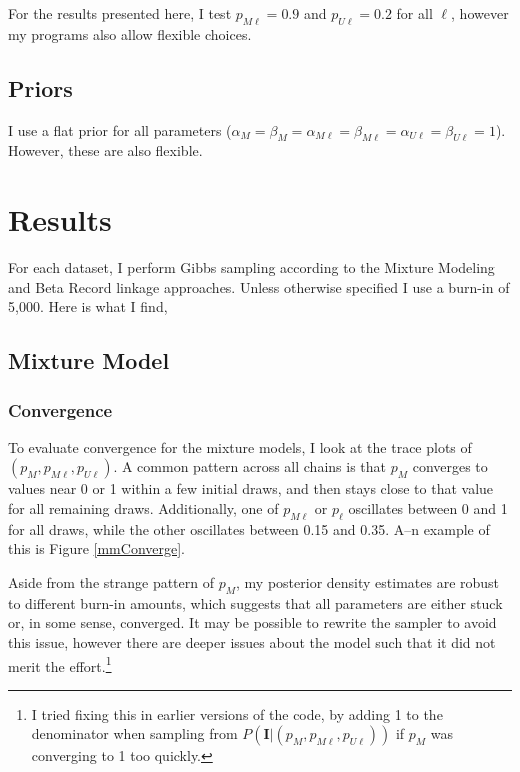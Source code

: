 \documentclass[11pt,reqno]{amsart}
\newcommand\params{(p_M, p_{M\ell}, p_{U\ell})}
\begin{document}
For the results presented here, I test $p_{M\ell} = 0.9$ and $p_{U\ell}=0.2$ for all $\ell$, however my programs also allow flexible choices.

\subsection{Priors}

I use a flat prior for all parameters ($\alpha_M=\beta_M=\alpha_{M\ell}=\beta_{M\ell}=\alpha_{U\ell}=\beta_{U\ell}=1$).  However, these are also flexible.  %


\section{Results}

For each dataset, I perform Gibbs sampling according to the Mixture Modeling and Beta Record linkage approaches.  Unless otherwise specified I use a burn-in of 5,000. Here is what I find, 

\subsection{Mixture Model} 

\subsubsection{Convergence} To evaluate convergence for the mixture models, I look at the trace plots of $\params$.  A common pattern across all chains is that $p_M$ converges to values near 0 or 1 within a few initial draws, and then stays close to that value for all remaining draws.  Additionally, one of $p_{M\ell}$ or $p_{\ell}$ oscillates between 0 and 1 for all draws, while the other oscillates between 0.15 and 0.35.  A--n example of this is Figure \ref{mmConverge}. 
  
Aside from the strange pattern of $p_M$, my posterior density estimates are robust to different burn-in amounts, which suggests that all parameters are either stuck or, in some sense, converged.  It may be possible to rewrite the sampler to avoid this issue,  however there are deeper issues about the model such that it did not merit the effort.\footnote{I tried fixing this in earlier versions of the code, by adding 1 to the denominator when sampling from $P(\mathbf{I} | \params)$ if $p_M$ was converging to 1 too quickly.} 
\end{document}
